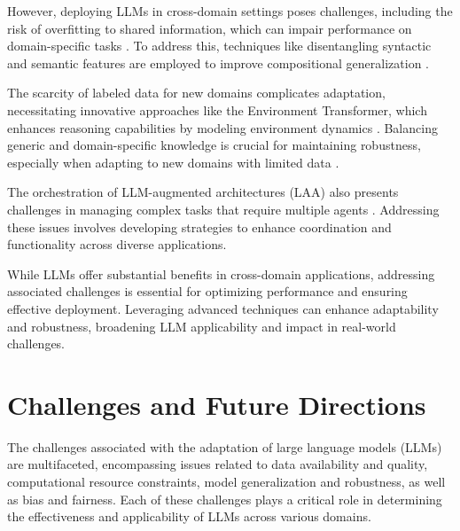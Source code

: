 However, deploying LLMs in cross-domain settings poses challenges, including the risk of overfitting to shared information, which can impair performance on domain-specific tasks \cite{zheng2023layerwiserepresentationfusioncompositional}. To address this, techniques like disentangling syntactic and semantic features are employed to improve compositional generalization \cite{zheng2023layerwiserepresentationfusioncompositional}.

The scarcity of labeled data for new domains complicates adaptation, necessitating innovative approaches like the Environment Transformer, which enhances reasoning capabilities by modeling environment dynamics \cite{wang2023environmenttransformerpolicyoptimization}. Balancing generic and domain-specific knowledge is crucial for maintaining robustness, especially when adapting to new domains with limited data \cite{kaur2024cropcontextwiserobuststatic}.

The orchestration of LLM-augmented architectures (LAA) also presents challenges in managing complex tasks that require multiple agents \cite{liu2023bolaabenchmarkingorchestratingllmaugmented}. Addressing these issues involves developing strategies to enhance coordination and functionality across diverse applications.

While LLMs offer substantial benefits in cross-domain applications, addressing associated challenges is essential for optimizing performance and ensuring effective deployment. Leveraging advanced techniques can enhance adaptability and robustness, broadening LLM applicability and impact in real-world challenges.








\section{Challenges and Future Directions} \label{sec:Challenges and Future Directions}

 

The challenges associated with the adaptation of large language models (LLMs) are multifaceted, encompassing issues related to data availability and quality, computational resource constraints, model generalization and robustness, as well as bias and fairness. Each of these challenges plays a critical role in determining the effectiveness and applicability of LLMs across various domains. 



